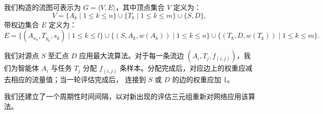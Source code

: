 我们构造的流图可表示为 $G = \langle V, E \rangle$，其中顶点集合 $V$ 定义为：
\begin{equation}\label{eq:vertex}
    V = \{A_k \mid 1 \le k \le n\} \cup \{T_k \mid 1 \le k \le m\} \cup \{S, D\},
\end{equation}
带权边集合 $E$ 定义为：
\begin{equation}\label{eq:edge}
    E = \{(A_{x_k}, T_{y_k}, s_k) \mid 1 \le k \le l\}
        \cup \{(S, A_k, w(A_k)) \mid 1 \le k \le n\}
        \cup \{(T_k, D, w(T_k)) \mid 1 \le k \le m\}.
\end{equation}

我们对源点 $S$ 至汇点 $D$ 应用最大流算法。对于每一条流边
$(A_i, T_j, f_{(i,j)})$，我们为智能体 $A_i$ 与任务 $T_j$ 分配 $f_{(i,j)}$
条样本。分配完成后，对应边上的权重应减去相应的流量值；当一轮评估完成后，
连接到 $S$ 或 $D$ 的边的权重应加 1。

我们还建立了一个周期性时间间隔，以对新出现的评估三元组重新对网络应用该算法。
